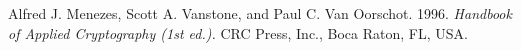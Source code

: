 \documentclass[11pt,letterpaper]{article}
\begin{document}


\begin{thebibliography}{}

\bibitem{}
Alfred J. Menezes, Scott A. Vanstone, and Paul C. Van Oorschot. 1996.
\textit{Handbook of Applied Cryptography (1st ed.).}
CRC Press, Inc., Boca Raton, FL, USA.

\end{thebibliography}
\end{document}
